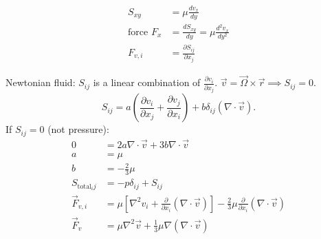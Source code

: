 \documentclass[11pt,a4paper]{article}
\newcommand{\pardiff}[2]{\frac{\partial #1}{\partial #2}}
\begin{document}
\begin{align*}
	S_{xy} &= \mu \frac{dv_x}{dy} \\
	\text{force } F_x &= \frac{d S_{xy}}{dy} = \mu \frac{d^2 v_x}{dy^2} \\
	F_{v,i} &= \pardiff{S_{ij}}{x_j}
\end{align*}

Newtonian fluid: $S_{ij}$ is a linear combination of $\pardiff{v_i}{x_j}$. $\vec v = \vec \Omega \times \vec r \implies S_{ij} = 0$.
$$
	S_{ij} = a \left( \pardiff{v_i}{x_j} + \pardiff{v_j}{x_i} \right) + b \delta_{ij}(\nabla \cdot \vec v).
$$
If $S_{ij} = 0$ (not pressure):
\begin{align*}
  0 &= 2a \nabla \cdot \vec v + 3b \nabla \cdot \vec v \\
  a &= \mu \\
  b &= -\frac{2}{3} \mu \\[6pt]
  S_{\text{total}_ij} &= -p \delta_{ij} + S_{ij} \\[6pt]
  \vec F_{v,i} &= \mu \left[ \nabla^2 v_i + \pardiff{}{x_i} ( \nabla \cdot \vec v ) \right]
                - \frac{2}{3} \mu \pardiff{}{x_i} (\nabla \cdot \vec v) \\
  \vec F_v &= \mu \nabla^2 \vec v + \frac{1}{3} \mu \nabla (\nabla \cdot \vec v)
\end{align*}
\end{document}
